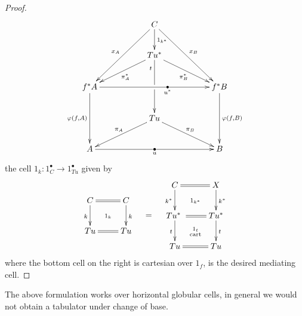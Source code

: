 \documentclass[9pt, leqno]{amsart}
\begin{document}
\begin{proof}
	\begin{equation*}
		\xymatrix{
			&& C \ar[ddrr]^{x_B} \ar[ddll]_{x_A} \ar[d]^{1_{k^*}} \\
			&& Tu^* \ar[dll]^{\pi_A^*} \ar[drr]_{\pi_B^*} \ar[dd]|\hole_(.20){t}
			\\
			f^*A \ar[dd]_{\cleav{f}{A}}\ar[rrrr]|(.6){\bullet}_(.6){u^*} &&&& f^*B \ar[dd]^{\cleav{f}{B}}\\
			&& Tu \ar[dll]_{\pi_A} \ar[drr]^{\pi_B} \\
			A \ar[rrrr]|{\bullet}_{u} &&&& B
		}
	\end{equation*}
	the cell $1_k \colon 1^{\bullet}_{C} \longrightarrow 1^{\bullet}_{Tu}$ given by
	\begin{equation*}
		\vcenter{\vbox{\xymatrix{
					C \ar[d]_{k} \ar@{=}[r] \ar@{}[dr]|{1_k} & C \ar[d]^{k}\\
					Tu \ar@{=}[r] & Tu
		}}}
		\quad
		=
		\quad
		\vcenter{\vbox{\xymatrix{
					C \ar[d]_{k^*} \ar@{=}[r] \ar@{}[dr]|{1_{k^*}} & X \ar[d]^{k^*}\\
					Tu^* \ar[d]_{t} \ar@{}[dr]|{\substack{1_t \\ \text{cart}}} \ar@{=}[r] \ & Tu^* \ar[d]^{t} \\
					Tu \ar@{=}[r] & Tu
		}}}
	\end{equation*}
	where the bottom cell on the right is cartesian over $1_f$, is the desired mediating cell. 
\end{proof}

\begin{remark}
	The above formulation works over horizontal globular cells, in general we would not obtain a tabulator under change of base.
\end{remark}

\end{document}
